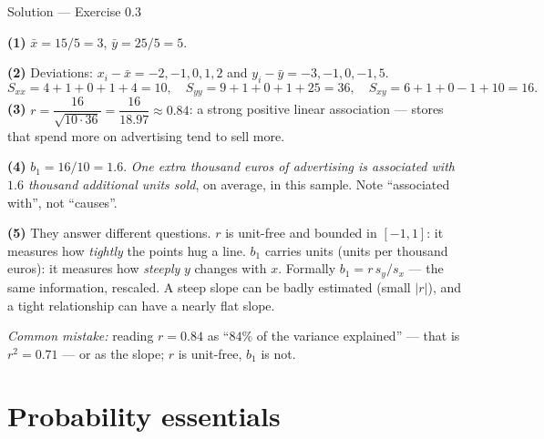 \documentclass[aspectratio=169,11pt]{beamer}
\begin{document}
\begin{frame}{Solution --- Exercise 0.3}
  \begin{solutionbox}
    \textbf{(1)} $\bar x = 15/5 = 3$, \quad $\bar y = 25/5 = 5$.

    \textbf{(2)} Deviations: $x_i - \bar x = -2,-1,0,1,2$ and
    $y_i - \bar y = -3,-1,0,-1,5$.
    \[
      S_{xx} = 4+1+0+1+4 = 10, \quad
      S_{yy} = 9+1+0+1+25 = 36, \quad
      S_{xy} = 6+1+0-1+10 = 16 .
    \]
    \textbf{(3)} $r = \dfrac{16}{\sqrt{10\cdot 36}} = \dfrac{16}{18.97}
    \approx 0.84$: a strong positive linear association --- stores that spend
    more on advertising tend to sell more.

    \textbf{(4)} $b_1 = 16/10 = 1.6$. \emph{One extra thousand euros of
    advertising is associated with $1.6$ thousand additional units sold},
    on average, in this sample. Note ``associated with'', not ``causes''.

    \textbf{(5)} They answer different questions. $r$ is unit-free and
    bounded in $[-1,1]$: it measures how \emph{tightly} the points hug a
    line. $b_1$ carries units (units per thousand euros): it measures how
    \emph{steeply} $y$ changes with $x$. Formally $b_1 = r\,s_y/s_x$ --- the
    same information, rescaled. A steep slope can be badly estimated
    (small $|r|$), and a tight relationship can have a nearly flat slope.

    \textit{Common mistake:} reading $r = 0.84$ as ``$84\%$ of the variance
    explained'' --- that is $r^2 = 0.71$ --- or as the slope; $r$ is
    unit-free, $b_1$ is not.
  \end{solutionbox}
\end{frame}


\section{Probability essentials}
\end{document}
